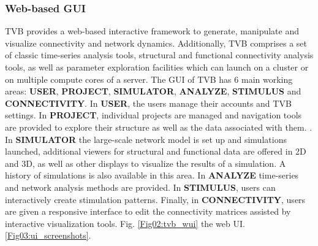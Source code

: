 \documentclass{bioinfo}
\begin{document}
\begin{methods}
    \subsubsection{Web-based GUI}
    TVB provides a web-based interactive framework to generate, manipulate and
    visualize connectivity and network dynamics. Additionally, TVB comprises a
    set of classic time-series analysis tools, structural and functional
    connectivity analysis tools, as well as parameter exploration facilities
    which can launch  on
    a cluster or on multiple compute  cores of a server. The GUI of TVB has 6
    main working areas: \textbf{USER},  \textbf{PROJECT}, \textbf{SIMULATOR},
    \textbf{ANALYZE}, \textbf{STIMULUS}  and \textbf{CONNECTIVITY}. In
    \textbf{USER}, the users manage their  accounts and TVB settings. In
    \textbf{PROJECT}, individual projects are  managed and navigation tools
    are provided to explore their structure as  well as the data associated
    with them. .
    In \textbf{SIMULATOR} the  large-scale network model is set up and
    simulations launched, additional  viewers for structural and functional
    data are offered in 2D and 3D, as  well as other displays to visualize the
    results of a simulation. A history  of simulations is also available in
    this area. In \textbf{ANALYZE} time-series and
    network analysis methods are provided. In \textbf{STIMULUS}, users can
    interactively create stimulation patterns.  Finally, in
    \textbf{CONNECTIVITY}, users are given a responsive interface  to edit the
    connectivity matrices assisted by interactive visualization  tools. Fig.
    \ref{Fig02:tvb_wui}  the web UI.  \ref{Fig03:ui_screenshots}.

  

    

\end{methods}
\end{document}

